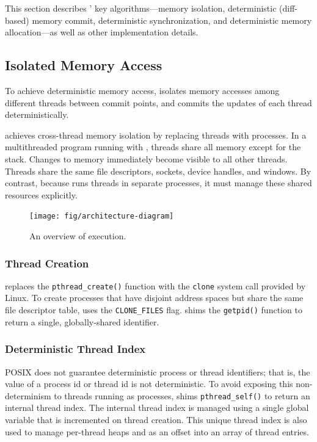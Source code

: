 \label{sec:dthreads-architecture}

This section describes \dthreads{}' key algorithms---mem\-ory
isolation, deterministic (diff-based) memory commit, deterministic
synchronization, and deterministic memory allocation---as well as
other implementation details.

\subsection{Isolated Memory Access}

\label{sec:threadsasprocs}
To achieve deterministic memory access, 
\dthreads{} isolates memory accesses among different
threads between commit points, and commits the updates of each thread deterministically.

\dthreads{} achieves cross-thread memory isolation by 
replacing threads with processes.  In a multithreaded program running
with \pthreads{}, threads share all memory except for the stack.  Changes
to memory immediately become visible to all other threads.  Threads share
the same file descriptors, sockets, device handles, and windows.
By contrast, because \dthreads{} runs threads in separate processes, it must manage these shared
resources explicitly.

\begin{figure}[h]
{\centering
\texttt{[image: fig/architecture-diagram]}
\caption{An overview of \dthreads{} execution.\label{fig:architecture}}
}
\end{figure}

\subsubsection{Thread Creation}

\dthreads{} replaces the \texttt{pthread\_create()} function with
the \texttt{clone} system call provided by Linux. To create
processes that have disjoint address spaces but share the same file descriptor table, \dthreads{} uses the \texttt{CLONE\_FILES} flag.
\dthreads{} shims the \texttt{getpid()} function to return a single, globally-shared identifier.

\subsubsection{Deterministic Thread Index}
\label{sec:threadindex}
POSIX does not guarantee deterministic process or thread identifiers;
that is, the value of a process id or thread id is not deterministic.
To avoid exposing this non-determinism to threads running as
processes, \dthreads{} shims
\texttt{pthread\_self()} to return an internal thread index.
The internal thread index is managed using a single global variable
that is incremented on thread creation.  This unique thread index is
also used to manage per-thread heaps and as an offset into an array of
thread entries.

